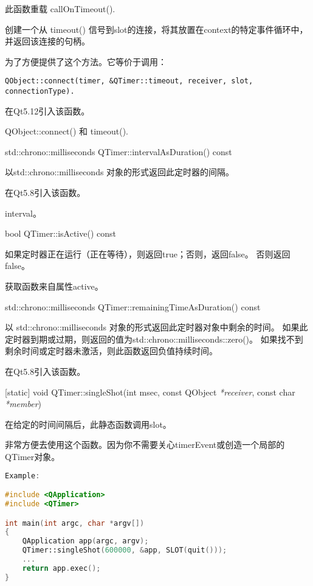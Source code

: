 此函数重载 callOnTimeout().

创建一个从 timeout() 信号到slot的连接，将其放置在context的特定事件循环中，并返回该连接的句柄。

为了方便提供了这个方法。它等价于调用：


\begin{lstlisting}
QObject::connect(timer, &QTimer::timeout, receiver, slot, connectionType).
\end{lstlisting}
	
在Qt5.12引入该函数。
	
\begin{notice}[另请参阅]
QObject::connect() 和 timeout().
\end{notice}

% 
std::chrono::milliseconds QTimer::intervalAsDuration() const

以std::chrono::milliseconds 对象的形式返回此定时器的间隔。

在Qt5.8引入该函数。

\begin{notice}[另请参阅]
interval。
\end{notice}

bool QTimer::isActive() const

如果定时器正在运行（正在等待），则返回true；否则，返回false。 否则返回false。

\begin{notice}
获取函数来自属性active。
\end{notice}

std::chrono::milliseconds QTimer::remainingTimeAsDuration() const

以 std::chrono::milliseconds 对象的形式返回此定时器对象中剩余的时间。 
如果此定时器到期或过期，则返回的值为std::chrono::milliseconds::zero()。 
如果找不到剩余时间或定时器未激活，则此函数返回负值持续时间。

在Qt5.8引入该函数。

[static] void QTimer::singleShot(int msec, const QObject \emph{*receiver}, const char \emph{*member})

在给定的时间间隔后，此静态函数调用slot。

非常方便去使用这个函数。因为你不需要关心timerEvent或创造一个局部的QTimer对象。

\begin{lstlisting}[language=C++]
Example:

#include <QApplication>
#include <QTimer>

int main(int argc, char *argv[])
{
	QApplication app(argc, argv);
	QTimer::singleShot(600000, &app, SLOT(quit()));
	...
	return app.exec();
}
\end{lstlisting}

